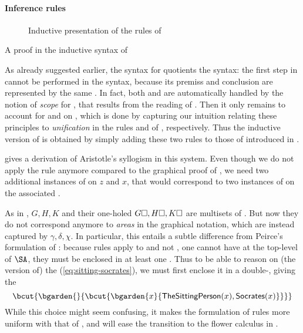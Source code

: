 \begin{scope}
\begin{scope}
\paragraph{Inference rules}

\begin{figure}
  
  \caption{Inductive presentation of the rules of }
\end{figure}

\begin{marginfigure}
  
  \caption{A proof in the inductive syntax of }
\end{marginfigure}

As already suggested earlier, the  syntax for  quotients the
 syntax: the first  step in 
cannot be performed in the  syntax, because its premiss and conclusion are
represented by the same . In fact, both  and
 are automatically handled by the notion of \emph{scope} for
, that results from the  reading of .
Then it only remains to account for  and  on
, which is done by capturing our intuition relating these principles to
\emph{unification} in the rules  and  of
, respectively. Thus the inductive version of  is obtained
by simply adding these two rules to those of  introduced in
.

 gives a derivation of Aristotle's syllogism
in this system. Even though we do not apply the  rule anymore compared
to the graphical proof of , we need two additional
instances of  on $z$ and $x$, that would correspond to two
instances of  on the associated .

\begin{remark}
  As in ,  $G, H, K$ and their one-holed 
  $G\square, H\square, K\square$ are multisets of . But now they do not
  correspond anymore to \emph{areas} in the graphical notation, which are
  instead captured by  $\gamma, \delta, \chi$. In particular, this
  entails a subtle difference from Peirce's formulation of : because
  rules apply to  and not , one cannot have  at the
  top-level of $\SA$, they must be enclosed in at least one . Thus to be able
  to reason on (the  version of) the  (\ref{eq:sitting-socrates}), we
  must first enclose it in a double-, giving the 
  $$\bcut{\bgarden{{}}{\bcut{\bgarden{x}{\mathsf{TheSittingPerson}(x),\mathsf{Socrates}(x)}}}}$$
  While this choice might seem confusing, it makes the formulation of rules more
  uniform with that of , and will ease the transition to the flower
  calculus in .
\end{remark}


\end{scope}
\end{scope}
